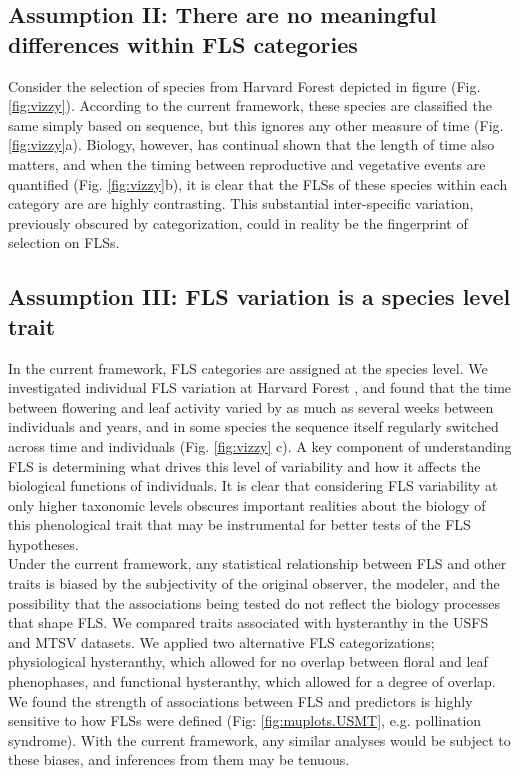\documentclass{article}
\begin{document}
\subsection*{Assumption II: There are no meaningful differences within FLS categories}
 Consider the selection of species from Harvard Forest depicted in figure (Fig. \ref{fig:vizzy}). According to the current framework, these species are classified the same simply based on sequence, but this ignores any other measure of time (Fig. \ref{fig:vizzy}a). Biology, however, has continual shown that the length of time also matters\citep{Inouye2019}, and when the timing between reproductive and vegetative events are quantified (Fig. \ref{fig:vizzy}b), it is clear that the FLSs of these species within each category are are highly contrasting. This substantial inter-specific variation, previously obscured by categorization, could in reality be the fingerprint of selection on FLSs. %

\subsection*{Assumption III: FLS variation is a species level trait}
In the current framework, FLS categories are assigned at the species level. We investigated individual FLS variation at Harvard Forest \citep{OKeefe2015}, and found that the time between flowering and leaf activity varied by as much as several weeks between individuals and years, and in some species the sequence itself regularly switched across time and individuals  (Fig. \ref{fig:vizzy} c). A key component of understanding FLS is determining what drives this level of variability and how it affects the biological functions of individuals. It is clear that considering FLS variability at only higher taxonomic levels obscures important realities about the biology of this phenological trait that may be instrumental for better tests of the FLS hypotheses.\\

\noindent Under the current framework, any statistical relationship between FLS and other traits is biased by the subjectivity of the original observer, the modeler, and the possibility that the associations being tested do not reflect the biology processes that shape FLS. We compared traits associated with hysteranthy in the USFS and MTSV datasets. We applied two alternative FLS categorizations; physiological hysteranthy, which allowed for no overlap between floral and leaf phenophases, and functional hysteranthy, which allowed for a degree of overlap. We found the strength of associations between FLS and predictors is highly sensitive to how FLSs were defined (Fig: \ref{fig:muplots.USMT}, e.g. pollination syndrome). With the current framework, any similar analyses would be subject to these biases, and inferences from them may be tenuous. \\
\end{document}
